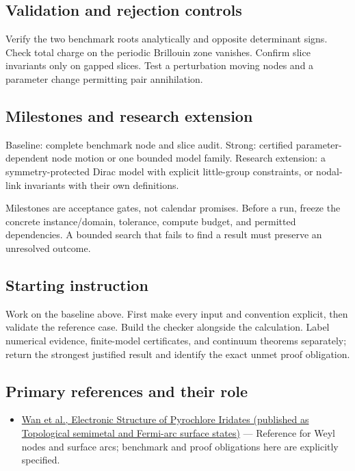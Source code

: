 \documentclass[
  11pt,
]{article}
\providecommand{\tightlist}{%
  \setlength{\itemsep}{0pt}\setlength{\parskip}{0pt}}
\begin{document}
\subsection{Validation and rejection controls}

Verify the two benchmark roots analytically and opposite determinant
signs. Check total charge on the periodic Brillouin zone vanishes.
Confirm slice invariants only on gapped slices. Test a perturbation
moving nodes and a parameter change permitting pair annihilation.

\subsection{Milestones and research extension}

Baseline: complete benchmark node and slice audit. Strong: certified
parameter-dependent node motion or one bounded model family. Research
extension: a symmetry-protected Dirac model with explicit little-group
constraints, or nodal-link invariants with their own definitions.

Milestones are acceptance gates, not calendar promises. Before a run,
freeze the concrete instance/domain, tolerance, compute budget, and
permitted dependencies. A bounded search that fails to find a result
must preserve an unresolved outcome.

\subsection{Starting instruction}

Work on the baseline above. First make every input and convention
explicit, then validate the reference case. Build the checker alongside
the calculation. Label numerical evidence, finite-model certificates,
and continuum theorems separately; return the strongest justified result
and identify the exact unmet proof obligation.

\subsection{Primary references and their role}

\begin{itemize}
\tightlist
\item
  \href{https://arxiv.org/abs/1007.0016}{Wan et al., Electronic
  Structure of Pyrochlore Iridates (published as Topological semimetal
  and Fermi-arc surface states)} --- Reference for Weyl nodes and
  surface arcs; benchmark and proof obligations here are explicitly
  specified.
\end{itemize}
\end{document}
